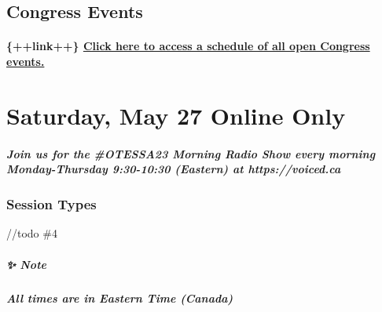\documentclass[
]{book}
\begin{document}
\hypertarget{congress-events}{%
\section*{Congress Events}\label{congress-events}}

\begin{vendor}
\hypertarget{link-click-here-to-access-a-schedule-of-all-open-congress-events.}{%
\subsubsection{\texorpdfstring{\{++link++\} \href{}{Click here to access
a schedule of all open Congress
events.}}{\{++link++\} Click here to access a schedule of all open Congress events.}}\label{link-click-here-to-access-a-schedule-of-all-open-congress-events.}}
\end{vendor}

\hypertarget{saturday-may-27-online-only}{%
\chapter{Saturday, May 27 \textbar{} Online Only}\label{saturday-may-27-online-only}}

\begin{protip}
\hypertarget{join-us-for-the-otessa23-morning-radio-show-every-morning-monday-thursday-930-1030-eastern-at-httpsvoiced.ca}{%
\paragraph{Join us for the \#OTESSA23 Morning Radio Show every morning
Monday-Thursday 9:30-10:30 (Eastern) at
https://voiced.ca}\label{join-us-for-the-otessa23-morning-radio-show-every-morning-monday-thursday-930-1030-eastern-at-httpsvoiced.ca}}
\end{protip}

\hypertarget{session-types}{%
\subsection*{Session Types}\label{session-types}}

//todo \#4

\begin{protip}
\hypertarget{note}{%
\paragraph*{✨ Note}\label{note}}

\textbf{\emph{All times are in Eastern Time (Canada)}}
\end{protip}
\end{document}
